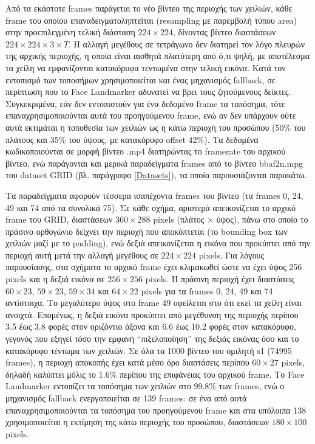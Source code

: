 Από τα εκάστοτε frames παράγεται το νέο βίντεο της περιοχής των χειλιών, κάθε frame του οποίου επαναδειγματοληπτείται (resampling με παρεμβολή τύπου area) στην προεπιλεγμένη τελική διάσταση $224 \times 224$, δίνοντας βίντεο διαστάσεων $224 \times 224 \times 3 \times T$. Η αλλαγή μεγέθους σε τετράγωνο δεν διατηρεί τον λόγο πλευρών της αρχικής περιοχής, η οποία είναι αισθητά πλατύτερη από ό,τι ψηλή, με αποτέλεσμα τα χείλη να εμφανίζονται κατακόρυφα τεντωμένα στην τελική εικόνα. Κατά τον εντοπισμό των τοποσήμων χρησιμοποιείται και ένας μηχανισμός fallback, σε περίπτωση που το Face Landmarker αδυνατεί να βρει τους ζητούμενους δείκτες. Συγκεκριμένα, εάν δεν εντοπιστούν για ένα δεδομένο frame τα τοπόσημα, τότε επαναχρησιμοποιούνται αυτά του προηγούμενου frame, ενώ αν δεν υπάρχουν ούτε αυτά εκτιμάται η τοποθεσία των χειλιών ως η κάτω περιοχή του προσώπου (50\% του πλάτους και 35\% του ύψους, με κατακόρυφο offset 42\%). Τα δεδομένα κωδικοποιούνται σε μορφή βίντεο .mp4 διατηρώντας το framerate του αρχικού βίντεο, ενώ παράγονται και μερικά παραδείγματα frames από το βίντεο bbaf2n.mpg του dataset GRID (βλ. παράγραφο \ref{Datasets}), τα οποία παρουσιάζονται παρακάτω.

Τα παραδείγματα αφορούν τέσσερα ισαπέχοντα frames του βίντεο (τα frames 0, 24, 49 και 74 από τα συνολικά 75). Σε κάθε σχήμα, αριστερά απεικονίζεται το αρχικό frame του GRID, διαστάσεων $360 \times 288$ pixels (πλάτος $\times$ ύψος), πάνω στο οποίο το πράσινο ορθογώνιο δείχνει την περιοχή που αποκόπτεται (το bounding box των χειλιών μαζί με το padding), ενώ δεξιά απεικονίζεται η εικόνα που προκύπτει από την περιοχή αυτή μετά την αλλαγή μεγέθους σε $224 \times 224$ pixels. Για λόγους παρουσίασης, στα σχήματα το αρχικό frame έχει κλιμακωθεί ώστε να έχει ύψος 256 pixels και η δεξιά εικόνα σε $256 \times 256$ pixels. Η πράσινη περιοχή έχει διαστάσεις $60 \times 23$, $59 \times 23$, $59 \times 34$ και $64 \times 22$ pixels για τα frames 0, 24, 49 και 74 αντίστοιχα. Το μεγαλύτερο ύψος στο frame 49 οφείλεται στο ότι εκεί τα χείλη είναι ανοιχτά. Επομένως, η δεξιά εικόνα προκύπτει από μεγέθυνση της περιοχής περίπου 3.5 έως 3.8 φορές στον οριζόντιο άξονα και 6.6 έως 10.2 φορές στον κατακόρυφο, γεγονός που εξηγεί τόσο την εμφανή ``πιξελοποίηση'' της δεξιάς εικόνας όσο και το κατακόρυφο τέντωμα των χειλιών. Σε όλα τα 1000 βίντεο του ομιλητή s1 (74995 frames), η περιοχή αποκοπής έχει κατά μέσο όρο διαστάσεις περίπου $60 \times 27$ pixels, δηλαδή καλύπτει μόλις το 1.6\% περίπου της επιφάνειας του αρχικού frame. Το Face Landmarker εντοπίζει τα τοπόσημα των χειλιών στο 99.8\% των frames, ενώ ο μηχανισμός fallback ενεργοποιείται σε 139 frames: σε ένα από αυτά επαναχρησιμοποιούνται τα τοπόσημα του προηγούμενου frame και στα υπόλοιπα 138 χρησιμοποιείται η εκτίμηση της κάτω περιοχής του προσώπου, διαστάσεων $180 \times 100$ pixels.

